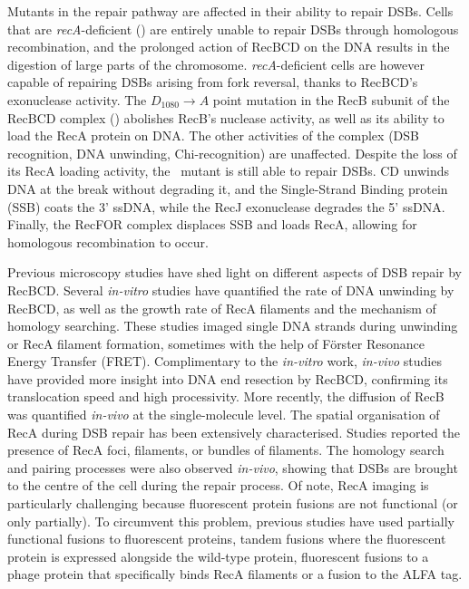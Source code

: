 Mutants in the repair pathway are affected in their ability to repair DSBs. Cells that are \emph{recA}-deficient (\dreca) are entirely unable to repair DSBs through homologous recombination, and the prolonged action of RecBCD on the DNA results in the digestion of large parts of the chromosome\cite{Horii1968, Chow2007}. \emph{recA}-deficient cells are however capable of repairing DSBs arising from fork reversal, thanks to RecBCD's exonuclease activity\cite{Seigneur1998, Michel2001}. The $D_{1080} \rightarrow A$ point mutation in the RecB subunit of the RecBCD complex (\teneighty) abolishes RecB's nuclease activity, as well as its ability to load the RecA protein on DNA\cite{Yu1998, Wang2000}. The other activities of the complex (DSB recognition, DNA unwinding, Chi-recognition) are unaffected\cite{Anderson1999}. Despite the loss of its RecA loading activity, the \teneighty\ mutant is still able to repair DSBs. \teneighty CD unwinds DNA at the break without degrading it, and the Single-Strand Binding protein (SSB) coats the 3' ssDNA, while the RecJ exonuclease degrades the 5' ssDNA. Finally, the RecFOR complex displaces SSB and loads RecA, allowing for homologous recombination to occur\cite{Ivancic-Bace_2003}.

Previous microscopy studies have shed light on different aspects of DSB repair by RecBCD. Several \emph{in-vitro} studies have quantified the rate of DNA unwinding by RecBCD\cite{Spies2003,Liu2013}, as well as the growth rate of RecA filaments\cite{Joo2006,Galletto2006,Handa2009} and the mechanism of homology searching\cite{Forget2012,Ragunathan2012}. These studies imaged single DNA strands during unwinding or RecA filament formation, sometimes with the help of Förster Resonance Energy Transfer (FRET)\cite{Joo2006,Ragunathan2012}. Complimentary to the \emph{in-vitro} work, \emph{in-vivo} studies have provided more insight into DNA end resection by RecBCD\cite{Wiktor2018}, confirming its translocation speed and high processivity. More recently, the diffusion of RecB was quantified \emph{in-vivo} at the single-molecule level\cite{Lepore2023}. The spatial organisation of RecA during DSB repair has been extensively characterised. Studies reported the presence of RecA foci\cite{Renzette2005,Renzette2007,Centore2007,Amarh2018}, filaments\cite{Kidane2005}, or bundles of filaments\cite{Lesterlin2013,Ghodke2019}. The homology search and pairing processes were also observed \emph{in-vivo}, showing that DSBs are brought to the centre of the cell during the repair process\cite{Badrinarayanan2015,Wiktor2021}. Of note, RecA imaging is particularly challenging because fluorescent protein fusions are not functional (or only partially). To circumvent this problem, previous studies have used partially functional fusions to fluorescent proteins\cite{Kidane2005,Renzette2005,Renzette2007,Centore2007,Lesterlin2013,Klimova2020}, tandem fusions where the fluorescent protein is expressed alongside the wild-type protein\cite{Amarh2018,Wiktor2021}, fluorescent fusions to a phage protein that specifically binds RecA filaments\cite{Ghodke2019} or a fusion to the ALFA tag\cite{Wiktor2021}.

